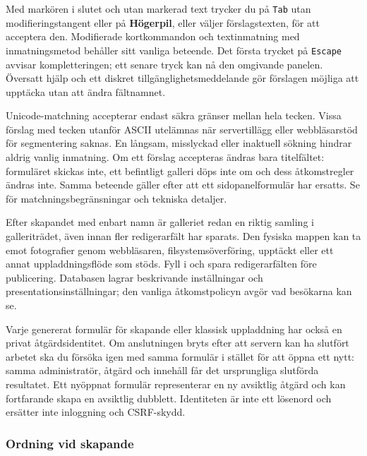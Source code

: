 \documentclass[11pt,a4paper]{article}
\newcommand{\filepath}[1]{\path{#1}}
\newcommand{\ui}[1]{\textbf{#1}}
\newcommand{\codeword}[1]{\nolinkurl{#1}}
\begin{document}
Med markören i slutet och utan markerad text trycker du på \codeword{Tab} utan
modifieringstangent eller på \ui{Högerpil}, eller väljer förslagstexten, för att
acceptera den. Modifierade kortkommandon och textinmatning med inmatningsmetod
behåller sitt vanliga beteende. Det första trycket på \codeword{Escape} avvisar
kompletteringen; ett senare tryck kan nå den omgivande panelen. Översatt hjälp
och ett diskret tillgänglighetsmeddelande gör förslagen möjliga att upptäcka
utan att ändra fältnamnet.

Unicode-matchning accepterar endast säkra gränser mellan hela tecken. Vissa
förslag med tecken utanför ASCII utelämnas när servertillägg eller webbläsarstöd
för segmentering saknas. En långsam, misslyckad eller inaktuell sökning hindrar
aldrig vanlig inmatning. Om ett förslag accepteras ändras bara titelfältet:
formuläret skickas inte, ett befintligt galleri döps inte om och dess
åtkomstregler ändras inte. Samma beteende gäller efter att ett sidopanelformulär
har ersatts. Se \filepath{docs/TITLE_COMPLETION.md} för matchningsbegränsningar
och tekniska detaljer.

Efter skapandet med enbart namn är galleriet redan en riktig samling i
galleriträdet, även innan fler redigerarfält har sparats. Den fysiska mappen kan
ta emot fotografier genom webbläsaren, filsystemsöverföring, upptäckt eller ett
annat uppladdningsflöde som stöds. Fyll i och spara redigerarfälten före
publicering. Databasen lagrar beskrivande inställningar och
presentationsinställningar; den vanliga åtkomstpolicyn avgör vad besökarna kan
se.

Varje genererat formulär för skapande eller klassisk uppladdning har också en
privat åtgärdsidentitet. Om anslutningen bryts efter att servern kan ha slutfört
arbetet ska du försöka igen med samma formulär i stället för att öppna ett nytt:
samma administratör, åtgärd och innehåll får det ursprungliga slutförda
resultatet. Ett nyöppnat formulär representerar en ny avsiktlig åtgärd och kan
fortfarande skapa en avsiktlig dubblett. Identiteten är inte ett lösenord och
ersätter inte inloggning och CSRF-skydd.

\subsubsection{Ordning vid skapande}
\end{document}
